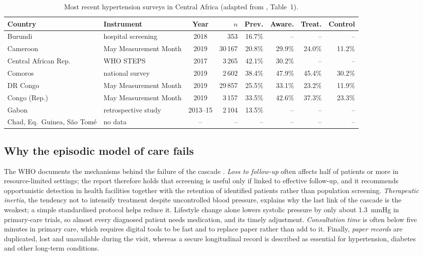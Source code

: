 \begin{table}[htbp]
\centering\footnotesize
\caption{Most recent hypertension surveys in Central Africa (adapted from \cite{gafane2024}, Table~1).}\label{tab:central-africa}
\begin{tabularx}{\textwidth}{@{}l >{\raggedright\arraybackslash}X c r r r r r@{}}
\toprule
\textbf{Country} & \textbf{Instrument} & \textbf{Year} & \textbf{$n$} & \textbf{Prev.} & \textbf{Aware.} & \textbf{Treat.} & \textbf{Control} \\
\midrule
Burundi & hospital screening & 2018 & 353 & 16.7\% & -- & -- & -- \\
Cameroon & May Measurement Month & 2019 & 30\,167 & 20.8\% & 29.9\% & 24.0\% & 11.2\% \\
Central African Rep. & WHO STEPS & 2017 & 3\,265 & 42.1\% & 30.2\% & -- & -- \\
Comoros & national survey & 2019 & 2\,602 & 38.4\% & 47.9\% & 45.4\% & 30.2\% \\
DR Congo & May Measurement Month & 2019 & 29\,857 & 25.5\% & 33.1\% & 23.2\% & 11.9\% \\
Congo (Rep.) & May Measurement Month & 2019 & 3\,157 & 33.5\% & 42.6\% & 37.3\% & 23.3\% \\
Gabon & retrospective study & 2013--15 & 2\,104 & 13.5\% & -- & -- & -- \\
Chad, Eq.\ Guinea, S\~ao Tom\'e & no data & -- & -- & -- & -- & -- & -- \\
\bottomrule
\end{tabularx}
\end{table}

\subsection{Why the episodic model of care fails}\label{sec:ltfu}\label{sec:inertia}

The WHO documents the mechanisms behind the failure of the cascade \parencite{who2023hypertension}. \emph{Loss to follow-up} often affects half of patients or more in resource-limited settings; the report therefore holds that screening is useful only if linked to effective follow-up, and it recommends opportunistic detection in health facilities together with the retention of identified patients rather than population screening. \emph{Therapeutic inertia}, the tendency not to intensify treatment despite uncontrolled blood pressure, explains why the last link of the cascade is the weakest; a simple standardised protocol helps reduce it. Lifestyle change alone lowers systolic pressure by only about 1.3~mmHg in primary-care trials, so almost every diagnosed patient needs medication, and its timely adjustment. \emph{Consultation time} is often below five minutes in primary care, which requires digital tools to be fast and to replace paper rather than add to it. Finally, \emph{paper records} are duplicated, lost and unavailable during the visit, whereas a secure longitudinal record is described as essential for hypertension, diabetes and other long-term conditions.

